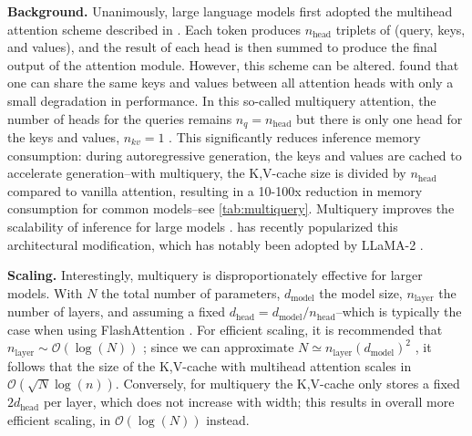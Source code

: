 \documentclass{article}
\begin{document}
\textbf{Background.} Unanimously, large language models first adopted the multihead attention scheme described in \citet{vaswani2017attention}. Each token produces $n_{\text{head}}$ triplets of (query, keys, and values), and the result of each head is then summed to produce the final output of the attention module. However, this scheme can be altered. \citet{multiquery} found that one can share the same keys and values between all attention heads with only a small degradation in performance. In this so-called multiquery attention, the number of heads for the queries remains $n_{q} = n_{\text{head}}$ but there is only one head for the keys and values, $n_{kv} = 1$ . This significantly reduces inference memory consumption: during autoregressive generation, the keys and values are cached to accelerate generation--with multiquery, the K,V-cache size is divided by $n_{\text{head}}$ compared to vanilla attention, resulting in a 10-100x reduction in memory consumption for common models--see \cref{tab:multiquery}. Multiquery improves the scalability of inference for large models \citep{pope2023efficiently}. \citet{palm} has recently popularized this architectural modification, which has notably been adopted by LLaMA-2 \citep{llama2}.

\textbf{Scaling.} Interestingly, multiquery is disproportionately effective for larger models. With $N$ the total number of parameters, $d_\text{model}$ the model size, $n_\text{layer}$ the number of layers, and assuming a fixed $d_\text{head} = d_\text{model} / n_{\text{head}}$--which is typically the case when using FlashAttention \citep{flash_attn}. For efficient scaling, it is recommended that $n_\text{layer} \sim \mathcal{O}(\log(N))$ \citep{levine2020limits}; since we can approximate $N \simeq n_\text{layer} (d_\text{model})^2$ \citep{kaplan2020scaling}, it follows that the size of the K,V-cache with multihead attention scales in $\mathcal{O}(\sqrt{N}\log(n))$. Conversely, for multiquery the K,V-cache only stores a fixed $2 d_\text{head}$ per layer, which does not increase with width; this results in overall more efficient scaling, in $\mathcal{O}(\log(N))$ instead.
\end{document}
